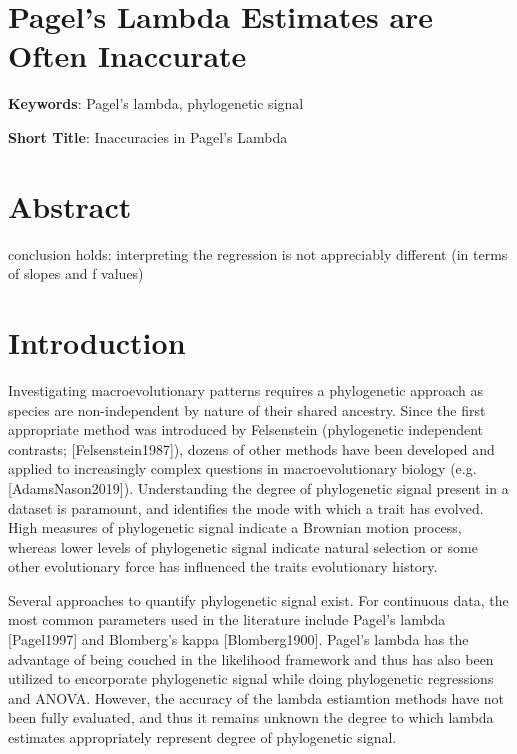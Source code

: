 \documentclass[]{article}
\date{}
\begin{document}
\section{Pagel's Lambda Estimates are Often
Inaccurate}\label{pagels-lambda-estimates-are-often-inaccurate}

\hfill\break

\textbf{Keywords}: Pagel's lambda, phylogenetic signal \hfill\break

\textbf{Short Title}: Inaccuracies in Pagel's Lambda \hfill\break

\section{Abstract}\label{abstract}

conclusion holds: interpreting the regression is not appreciably
different (in terms of slopes and f values)

\newpage

\section{Introduction}\label{introduction}

Investigating macroevolutionary patterns requires a phylogenetic
approach as species are non-independent by nature of their shared
ancestry. Since the first appropriate method was introduced by
Felsenstein (phylogenetic independent contrasts; {[}Felsenstein1987{]}),
dozens of other methods have been developed and applied to increasingly
complex questions in macroevolutionary biology (e.g.
{[}AdamsNason2019{]}). Understanding the degree of phylogenetic signal
present in a dataset is paramount, and identifies the mode with which a
trait has evolved. High measures of phylogenetic signal indicate a
Brownian motion process, whereas lower levels of phylogenetic signal
indicate natural selection or some other evolutionary force has
influenced the traits evolutionary history. \hfill\break

Several approaches to quantify phylogenetic signal exist. For continuous
data, the most common parameters used in the literature include Pagel's
lambda {[}Pagel1997{]} and Blomberg's kappa {[}Blomberg1900{]}. Pagel's
lambda has the advantage of being couched in the likelihood framework
and thus has also been utilized to encorporate phylogenetic signal while
doing phylogenetic regressions and ANOVA. However, the accuracy of the
lambda estiamtion methods have not been fully evaluated, and thus it
remains unknown the degree to which lambda estimates appropriately
represent degree of phylogenetic signal. \hfill\break
\end{document}

